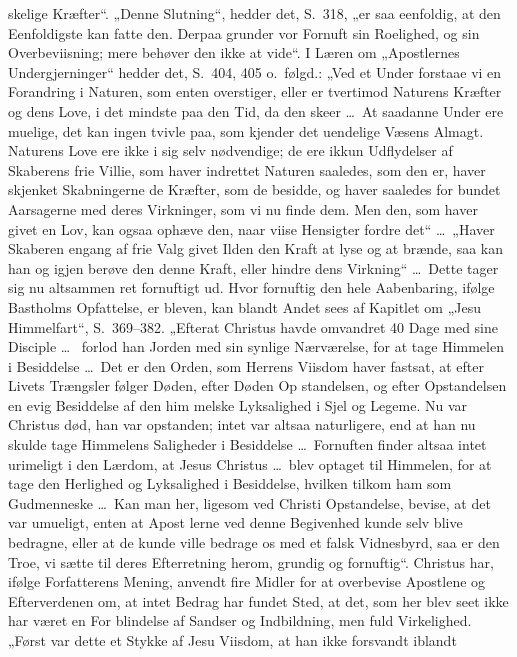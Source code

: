 \documentclass[12pt,a4paper]{article}
\newcommand{\opage}[1]{\marginnote{\footnotesize\textit{[#1]}}}
\begin{document}
skelige Kræfter“. „Denne Slutning“, hedder det, S.\ 318, „er saa
eenfoldig, at den Eenfoldigste kan fatte den. Derpaa grunder vor
Fornuft sin Roelighed, og sin Overbeviisning; mere behøver den
ikke at vide“. I Læren om „Apostlernes Undergjerninger“ hedder det,
S.\ 404, 405 o.\ følgd.: „Ved et Under forstaae vi en Forandring i
Naturen, som enten overstiger, eller er tvertimod Naturens Kræfter
og dens Love, i det mindste paa den Tid, da den skeer \ldots\ At
saadanne Under ere muelige, det kan ingen tvivle paa, som kjender
det uendelige Væsens Almagt. Naturens Love ere ikke i sig selv
nødvendige; de ere ikkun Udflydelser af Skaberens frie Villie, som
haver indrettet Naturen saaledes, som den er, haver skjenket
Skabningerne de Kræfter, som de besidde, og haver saaledes for\-%
\opage{28}bundet Aarsagerne med deres Virkninger, som vi nu finde dem. Men
den, som haver givet en Lov, kan ogsaa ophæve den, naar viise
Hensigter fordre det“ \ldots\ „Haver Skaberen engang af frie Valg
givet Ilden den Kraft at lyse og at brænde, saa kan han og igjen
berøve den denne Kraft, eller hindre dens Virkning“ \ldots\ Dette tager
sig nu altsammen ret fornuftigt ud. Hvor fornuftig den hele
Aabenbaring, ifølge Bastholms Opfattelse, er bleven, kan blandt
Andet sees af Kapitlet om „Jesu Himmelfart“, S.\ 369--382.
„Efterat Christus havde omvandret 40 Dage med sine Disciple \ldots\ %
forlod han Jorden med sin synlige Nærværelse, for at tage Himmelen
i Besiddelse \ldots\ Det er den Orden, som Herrens Viisdom haver
fastsat, at efter Livets Trængsler følger Døden, efter Døden Op\-%
standelsen, og efter Opstandelsen en evig Besiddelse af den him\-%
melske Lyksalighed i Sjel og Legeme. Nu var Christus død, han
var opstanden; intet var altsaa naturligere, end at han nu skulde tage
Himmelens Saligheder i Besiddelse \ldots\ Fornuften finder altsaa intet
urimeligt i den Lærdom, at Jesus Christus \ldots\ blev optaget til
Himmelen, for at tage den Herlighed og Lyksalighed i Besiddelse,
hvilken tilkom ham som Gudmenneske \ldots\ Kan man her, ligesom
ved Christi Opstandelse, bevise, at det var umueligt, enten at Apost\-%
lerne ved denne Begivenhed kunde selv blive bedragne, eller at de
kunde ville bedrage os med et falsk Vidnesbyrd, saa er den Troe,
vi sætte til deres Efterretning herom, grundig og fornuftig“.
Christus har, ifølge Forfatterens Mening, anvendt fire Midler for
at overbevise Apostlene og Efterverdenen om, at intet Bedrag har
fundet Sted, at det, som her blev seet ikke har været en For\-%
blindelse af Sandser og Indbildning, men fuld Virkelighed. „Først
var dette et Stykke af Jesu Viisdom, at han ikke forsvandt iblandt
\end{document}

